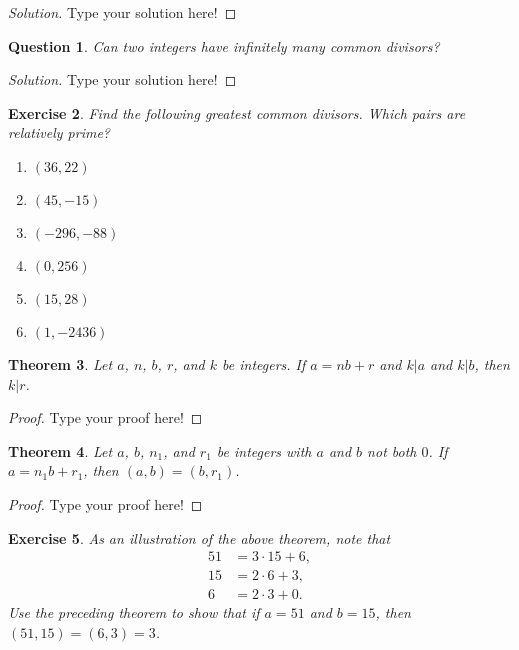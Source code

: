 \documentclass[12pt,leqno]{article}
\numberwithin{equation}{section}
\newtheorem{thm}{Theorem}[section]
\newtheorem{exer}[thm]{Exercise}
\newtheorem{ques}[thm]{Question}
\theoremstyle{definition}
\begin{document}
\begin{proof}[Solution]
Type your solution here!
\end{proof}

\begin{ques}
Can two integers have infinitely many common divisors?
\end{ques}

\begin{proof}[Solution]
Type your solution here!
\end{proof}

\begin{exer}
Find the following greatest common divisors. Which pairs are
relatively prime?
\begin{enumerate}
    \item[(1)] $(36,22)$
    \item[(2)] $(45,-15)$
    \item[(3)] $(-296,-88)$
    \item[(4)] $(0,256)$
    \item[(5)] $(15,28)$
    \item[(6)] $(1,-2436)$
\end{enumerate}
\end{exer}

\begin{thm}
Let $a$, $n$, $b$, $r$, and $k$ be integers. If $a = nb + r$ and
$k|a$ and $k|b$, then $k|r$.
\end{thm}

\begin{proof}[Proof]
Type your proof here!
\end{proof}

\begin{thm}
Let $a$, $b$, $n_1$, and $r_1$ be integers with $a$ and $b$ not both
$0$. If $a = n_1b + r_1$, then $(a, b) = (b , r_1)$.
\end{thm}

\begin{proof}[Proof]
Type your proof here!
\end{proof}

\begin{exer}
 As an illustration of the above theorem, note that
\begin{align*}
51 & = 3 \cdot 15 + 6, \\
15 & = 2 \cdot 6 + 3, \\
6 & = 2 \cdot 3 + 0.
\end{align*}
Use the preceding theorem to show that if $a = 51$ and $b = 15$,
then $(51, 15) = (6, 3) = 3$.
\end{exer}
\end{document}
